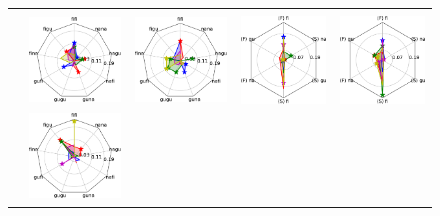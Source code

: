 \begin{figure}[ht]
\begin{tabular}{lcccc}
\hspace{-4ex}
\\
\hspace{-4ex}
{}
\hspace{-4ex}
&{\includegraphics[width=.23\linewidth]{figures/part_II/roi_plots/IFGorb/Vis/radial_word.pdf}}
\hspace{-4ex}
&{\includegraphics[width=.23\linewidth]{figures/part_II/roi_plots/IFGorb/Aud/radial_word.pdf}}
\hspace{-4ex}
&{\includegraphics[width=.23\linewidth]{figures/part_II/roi_plots/IFGorb/Vis/radial_joint.pdf}}
\hspace{-4ex}
&{\includegraphics[width=.23\linewidth]{figures/part_II/roi_plots/IFGorb/Aud/radial_joint.pdf}}
\hspace{-4ex}
\\
\hspace{-4ex}
{}
\hspace{-4ex}
&{\includegraphics[width=.23\linewidth]{figures/part_II/roi_plots/IFGtri/Vis/radial_word.pdf}}

\end{tabular}
\end{figure}

